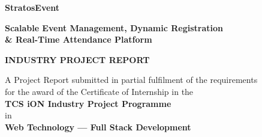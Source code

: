 \documentclass[11pt,a4paper]{report}
\begin{document}
\begin{titlepage}
\thispagestyle{empty}
\begin{center}

  \vspace*{0.4in}

  {\color{TitleBlue}\bfseries
   \fontsize{28}{34}\selectfont
   StratosEvent\par}

  \vspace{0.08in}

  {\color{TitleBlue}\bfseries
   \fontsize{18}{24}\selectfont
   Scalable Event Management, Dynamic Registration\\
   \& Real-Time Attendance Platform\par}

  \vspace{0.25in}

  {\color{TCSBlue}\bfseries
   \fontsize{14}{18}\selectfont
   INDUSTRY PROJECT REPORT\par}

  \vspace{0.15in}

  {\fontsize{11}{16}\selectfont
    A Project Report submitted in partial fulfilment of the requirements\\
    for the award of the Certificate of Internship in the\\
    \textbf{TCS iON Industry Project Programme}\\
    in\\
    \textbf{Web Technology --- Full Stack Development}\\
  }

  \vspace{0.35in}

  \begingroup
  \fontsize{10}{13}\selectfont
  \renewcommand{\arraystretch}{1.45}
  \setlength{\tabcolsep}{8pt}


\end{center}
\end{titlepage}
\end{document}

